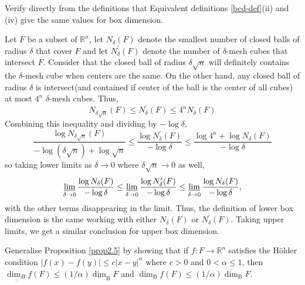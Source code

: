 \begin{customexercise}{2.1}
    Verify directly from the definitions that Equivalent definitions \ref{bcd-def}(ii) and (iv) give the same values for box dimension.
\end{customexercise}

\begin{customsol}{2.1}
    Let $F$ be a subset of $\mathbb{R}^{n}$, let $N_{\delta}(F)$ denote the smallest number of closed balls of radius $\delta$ that cover $F$ and let $N_{\delta}^{\prime}(F)$ denote the number of $\delta$-mesh cubes that intersect $F$. 
    Consider that the closed ball of radius $\delta\sqrt{n}$ will definitely contains the $\delta$-mesh cube when centers are the same. On the other hand, any closed ball of radius $\delta$ is intersect(and contained if center of the ball is the center of all cubes) at most $4^n$ $\delta$-mesh cubes. Thus, 
    $$
    N_{\delta \sqrt{n}}(F) \leq N_{\delta}^{\prime}(F) \leq 4^{n} N_{\delta}(F)
    $$
    Combining this inequality and dividing by $-\log \delta$,
$$
\frac{\log N_{\delta \sqrt{n}}(F)}{-\log (\delta \sqrt{n})+\log \sqrt{n}} \leq \frac{\log N_{\delta}^{\prime}(F)}{-\log \delta} \leq \frac{\log 4^{n}+\log N_{\delta}(F)}{-\log \delta}
$$
so taking lower limits as $\delta \rightarrow 0$ where $\delta\sqrt{n}\rightarrow 0 $ as well,
$$
\operatorname*{\underline{lim}} _{\delta \rightarrow 0} \frac{\log N_{\delta}(F)}{-\log \delta} \leq \operatorname*{\underline{lim}} _{\delta \rightarrow 0} \frac{\log N_{\delta}^{\prime}(F)}{-\log \delta} \leq \operatorname*{\underline{lim}} _{\delta \rightarrow 0} \frac{\log N_{\delta}(F)}{-\log \delta},
$$
with the other terms disappearing in the limit. Thus, the definition of lower box dimension is the same working with either $N_{\delta}(F)$ or $N_{\delta}^{\prime}(F)$. Taking upper limits, we get a similar conclusion for upper box dimension.
\end{customsol}


\begin{customexercise}{2.2}
    Generalise Proposition \ref{prop2.5} by showing that if $f: F \rightarrow \mathbb{R}^{n}$ satisfies the Hölder condition $|f(x)-f(y)| \leq c|x-y|^{\alpha}$ where $c>0$ and $0<\alpha \leq 1$, then $\underline{\operatorname{dim}_{B}} f(F) \leq(1 / \alpha) \underline{\operatorname{dim}}_{\mathrm{B}} F$ and $\overline{\operatorname{dim}}_{\mathrm{B}} f(F) \leq(1 / \alpha) \overline{\operatorname{dim}}_{\mathrm{B}} F$.
\end{customexercise}

